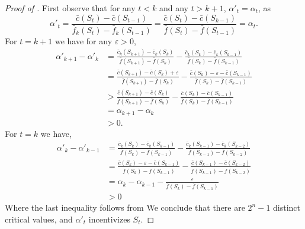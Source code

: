 \documentclass[11pt]{article}
\newcommand{\eps}{\varepsilon}
\newcommand{\feq}{\bar{f}}
\newcommand{\ceq}{\bar{c}}
\begin{document}
\begin{proof}[Proof of ]
    First observe that for any $t < k$ and any $t>k+1$, $\alpha'_t = \alpha_t$, as
    $$
    \alpha'_t 
    =
    \frac{\ceq(S_t) - \ceq(S_{t-1})}{\feq_k(S_t) - \feq_k(S_{t-1})} 
    =
    \frac{\ceq(S_t) - \ceq(S_{k-1})}{\feq(S_t) - \feq(S_{t-1})} 
    =
    \alpha_t.
    $$  
    For $t=k+1$ we have for any $\eps >0$,
    \begin{align*}
        \alpha'_{k+1}  - \alpha'_k
        &=
        \frac{\ceq_k(S_{k+1}) - \ceq_k(S_{k})}{\feq(S_{k+1}) - \feq(S_{k})} 
        - 
        \frac{\ceq_k(S_{k}) - \ceq_k(S_{k-1})}{\feq(S_{k}) - \feq(S_{k-1})} \\
        &=
        \frac{\ceq(S_{k+1}) - \ceq(S_{k}) + \eps}{\feq(S_{k+1}) - \feq(S_{k})} 
        - 
        \frac{\ceq(S_{k}) - \eps - \ceq(S_{k-1})}{\feq(S_{k}) - \feq(S_{k-1})} \\
        &>
        \frac{\ceq(S_{k+1}) - \ceq(S_{k})}{\feq(S_{k+1}) - \feq(S_{k})} 
        - 
        \frac{\ceq(S_{k}) - \ceq(S_{k-1})}{\feq(S_{k}) - \feq(S_{k-1})} \\
        &=
        \alpha_{k+1}  - \alpha_k \\
        &>
        0.
    \end{align*}
    For $t=k$ we have,
    \begin{align*}
        \alpha'_k  - \alpha'_{k-1}
        &=
        \frac{\ceq_k(S_k) - \ceq_k(S_{k-1})}{\feq(S_k) - \feq(S_{k-1})} 
        - 
        \frac{\ceq_k(S_{k-1}) - \ceq_k(S_{k-2})}{\feq(S_{k-1}) - \feq(S_{k-2})} \\
        &=
        \frac{\ceq(S_k) - \eps - \ceq(S_{k-1})}{\feq(S_k) - \feq(S_{k-1})} 
        - 
        \frac{\ceq(S_{k-1}) - \ceq(S_{k-2})}{\feq(S_{k-1}) - \feq(S_{k-2})} \\
        &=
        \alpha_k - \alpha_{k-1}
        -\frac{\eps}{\feq(S_k) - \feq(S_{k-1})} \\
        &> 0
    \end{align*}
    Where the last inequality follows from 
    We conclude that there are $2^n-1$ distinct critical values, and $\alpha'_t$ incentivizes $S_t$.


\end{proof}
\end{document}
